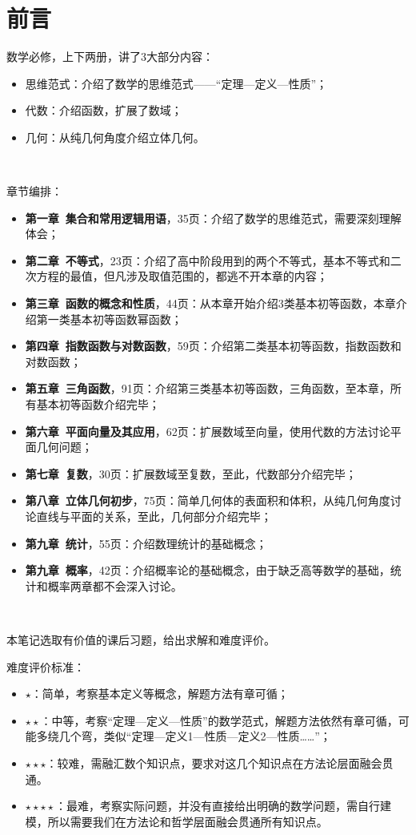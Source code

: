 \chapter{前言}

数学必修，上下两册，讲了3大部分内容：
\begin{itemize}
    \item 思维范式：介绍了数学的思维范式——“定理—定义—性质”；
    \item 代数：介绍函数，扩展了数域；
    \item 几何：从纯几何角度介绍立体几何。
\end{itemize}

~

章节编排：
\begin{itemize}
    \item {\bf 第一章\ 集合和常用逻辑用语}，35页：介绍了数学的思维范式，需要深刻理解体会；
    \item {\bf 第二章\ 不等式}，23页：介绍了高中阶段用到的两个不等式，基本不等式和二次方程的最值，但凡涉及取值范围的，都逃不开本章的内容；
    \item {\bf 第三章\ 函数的概念和性质}，44页：从本章开始介绍3类基本初等函数，本章介绍第一类基本初等函数幂函数；
    \item {\bf 第四章\ 指数函数与对数函数}，59页：介绍第二类基本初等函数，指数函数和对数函数；
    \item {\bf 第五章\ 三角函数}，91页：介绍第三类基本初等函数，三角函数，至本章，所有基本初等函数介绍完毕；
    \item {\bf 第六章\ 平面向量及其应用}，62页：扩展数域至向量，使用代数的方法讨论平面几何问题；
    \item {\bf 第七章\ 复数}，30页：扩展数域至复数，至此，代数部分介绍完毕；
    \item {\bf 第八章\ 立体几何初步}，75页：简单几何体的表面积和体积，从纯几何角度讨论直线与平面的关系，至此，几何部分介绍完毕；
    \item {\bf 第九章\ 统计}，55页：介绍数理统计的基础概念；
    \item {\bf 第九章\ 概率}，42页：介绍概率论的基础概念，由于缺乏高等数学的基础，统计和概率两章都不会深入讨论。
\end{itemize}

~

本笔记选取有价值的课后习题，给出求解和难度评价。

难度评价标准：
\begin{itemize}
    \item $\star $：简单，考察基本定义等概念，解题方法有章可循；
    \item $\star \star $：中等，考察“定理—定义—性质”的数学范式，解题方法依然有章可循，可能多绕几个弯，类似“定理—定义1—性质—定义2—性质……”；
    \item $\star \star \star $：较难，需融汇数个知识点，要求对这几个知识点在方法论层面融会贯通。
    \item $\star \star \star \star $：最难，考察实际问题，并没有直接给出明确的数学问题，需自行建模，所以需要我们在方法论和哲学层面融会贯通所有知识点。
\end{itemize}




